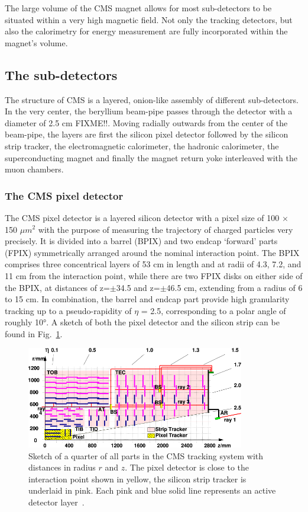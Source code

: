 The large volume of the CMS magnet allows for most sub-detectors to be situated within a very high magnetic field. Not only the
tracking detectors, but also the calorimetry for energy measurement are fully incorporated within the magnet's volume.



\subsection{The sub-detectors}
\label{sub:cms_subdet}
The structure of CMS is a layered, onion-like assembly of different sub-detectors. In the very center, the beryllium beam-pipe
passes through the detector with a diameter of 2.5 cm FIXME!!. Moving radially outwards from the center of the beam-pipe,
the layers are first the silicon pixel detector followed by the silicon strip tracker, the electromagnetic calorimeter,
the hadronic calorimeter, the superconducting magnet and finally the magnet return yoke interleaved with the muon chambers.

\subsubsection*{The CMS pixel detector}
The CMS pixel detector is a layered silicon detector with a pixel size of 100 $\times$ 150 $\mu m^2$ with the purpose of measuring the
trajectory of charged particles very precisely. It is divided into
a barrel (BPIX) and two endcap `forward' parts (FPIX) symmetrically arranged around the nominal interaction point. The BPIX comprises three
concentrical layers of 53 cm in length and at radii of \num{4.3}, \num{7.2}, and \num{11} cm from the interaction point, while there are two FPIX 
disks on either side of the BPIX, at distances of z=$\pm$\num{34.5} and z=$\pm$\num{46.5} cm, extending from a radius of \num{6} to 15 cm.
In combination, the barrel and endcap part provide high granularity tracking up to a pseudo-rapidity of $\eta$ = 2.5, corresponding to a 
polar angle of roughly \ang{10}.
A sketch of both the pixel detector and the silicon strip can be found in Fig.~\ref{fig:tracker}.

\begin{figure}[h!]
    \centering
    \includegraphics[width=0.85\textwidth]{../figs/tracker.png}
    \caption{Sketch of a quarter of all parts in the CMS tracking system with distances in radius $r$ and $z$. The pixel detector is close to the
interaction point shown in yellow, the silicon strip tracker is underlaid in pink. Each pink and blue solid line represents an active
detector layer~\cite{cmstrackeralignment}.}
    \label{fig:tracker}
\end{figure}

